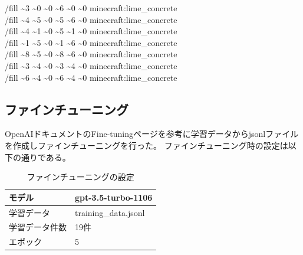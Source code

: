 {{    /fill \textasciitilde3 \textasciitilde0 \textasciitilde0 \textasciitilde6 \textasciitilde0 \textasciitilde0 minecraft:lime\_concrete\\
    /fill \textasciitilde4 \textasciitilde5 \textasciitilde0 \textasciitilde5 \textasciitilde6 \textasciitilde0 minecraft:lime\_concrete\\
    /fill \textasciitilde4 \textasciitilde1 \textasciitilde0 \textasciitilde5 \textasciitilde1 \textasciitilde0 minecraft:lime\_concrete\\
    /fill \textasciitilde1 \textasciitilde5 \textasciitilde0 \textasciitilde1 \textasciitilde6 \textasciitilde0 minecraft:lime\_concrete\\
    /fill \textasciitilde8 \textasciitilde5 \textasciitilde0 \textasciitilde8 \textasciitilde6 \textasciitilde0 minecraft:lime\_concrete\\
    /fill \textasciitilde3 \textasciitilde4 \textasciitilde0 \textasciitilde3 \textasciitilde4 \textasciitilde0 minecraft:lime\_concrete\\
    /fill \textasciitilde6 \textasciitilde4 \textasciitilde0 \textasciitilde6 \textasciitilde4 \textasciitilde0 minecraft:lime\_concrete\\
    }
}
\newpage

\subsection{ファインチューニング}
OpenAIドキュメントのFine-tuningページ\cite{bib:fine-tuning}を参考に学習データからjsonlファイルを作成しファインチューニングを行った。
ファインチューニング時の設定は以下の通りである。

\begin{table}[H]
    \caption{ファインチューニングの設定}\label{tab:finetuning}
    \centering
    \begin{tabular}{ll}
        \hline \hline
        モデル & gpt-3.5-turbo-1106 \\
        \hline
        学習データ & training\_data.jsonl \\
        \hline
        学習データ件数 & 19件 \\
        \hline
        エポック & 5 \\
        \hline
    \end{tabular}
\end{table}